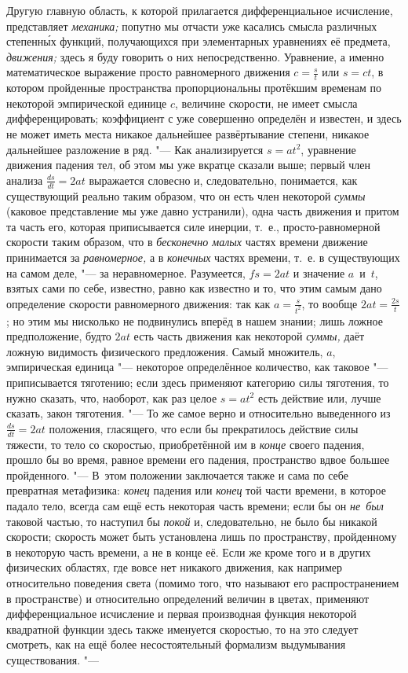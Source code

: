 Другую главную область, к которой прилагается дифференциальное исчисление,
представляет {\em механика;} попутно мы отчасти уже касались смысла различных
степенн\'{ы}х функций, получающихся при элементарных уравнениях её предмета,
{\em движения;} здесь я буду говорить о них непосредственно. Уравнение, а
именно математическое выражение просто равномерного движения $c=\frac s t$ или
$s=ct$, в котором пройденные пространства пропорциональны протёкшим временам по
некоторой эмпирической единице $c$, величине скорости, не имеет смысла
дифференцировать; коэффициент с уже совершенно определён и известен, и здесь не
может иметь места никакое дальнейшее развёртывание степени, никакое дальнейшее
разложение в ряд. "--- Как анализируется $s=at^2$, уравнение движения падения
тел, об этом мы уже вкратце сказали выше; первый член анализа
$\frac{ds}{dt}=2at$ выражается словесно и, следовательно, понимается, как
существующий реально таким образом, что он есть член некоторой {\em суммы}
(каковое представление мы уже давно устранили), одна часть движения и притом та
часть его, которая приписывается силе инерции, т.~е., просто-равномерной
скорости таким образом, что в {\em бесконечно малых} частях времени движение
принимается за {\em равномерное,} а в {\em конечных} частях времени, т.~е. в
существующих на самом деле, "--- за неравномерное. Разумеется, $fs=2at$ и
значение $a$~и~$t$, взятых сами по себе, известно, равно как известно и то, что
этим самым дано определение скорости равномерного движения: так как $a=\frac
s{t^2}$, то вообще $2at=\frac{2s} t$; но этим мы нисколько не подвинулись
вперёд в нашем знании; лишь ложное предположение, будто $2at$ есть часть
движения как некоторой {\em суммы,} даёт ложную видимость физического
предложения. Самый множитель, $a$, эмпирическая единица "--- некоторое
определённое количество, как таковое "--- приписывается тяготению; если здесь
применяют категорию силы тяготения, то нужно сказать, что, наоборот, как раз
целое $s=at^2$ есть действие или, лучше сказать, закон тяготения. "--- То же
самое верно и относительно выведенного из $\frac{ds}{dt}=2at$ положения,
гласящего, что если бы прекратилось действие силы тяжести, то тело со
скоростью, приобретённой им в {\em конце} своего падения, прошло бы во время,
равное времени его падения, пространство вдвое большее пройденного. "--- В~этом
положении заключается также и сама по себе превратная метафизика: {\em конец}
падения или {\em конец} той части времени, в которое падало тело, всегда сам
ещё есть некоторая часть времени; если бы он {\em не~был} таковой частью, то
наступил бы {\em покой} и, следовательно, не было бы никакой скорости; скорость
может быть установлена лишь по пространству, пройденному в некоторую часть
времени, а не в конце её. Если же кроме того и в других физических областях,
где вовсе нет никакого движения, как например относительно поведения света
(помимо того, что называют его распространением в пространстве) и относительно
определений величин в цветах, применяют дифференциальное исчисление и первая
производная функция некоторой квадратной функции здесь также именуется
скоростью, то на это следует смотреть, как на ещё более несостоятельный
формализм выдумывания существования. "---


